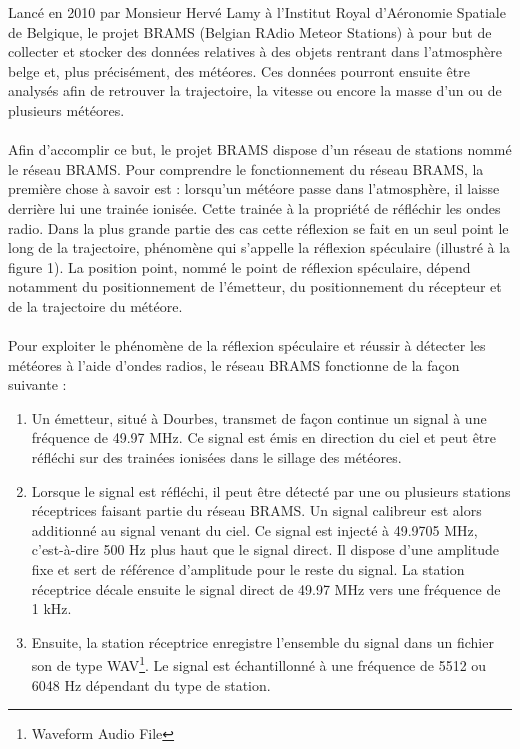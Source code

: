 \documentclass[11pt]{article}
\begin{document}
Lancé en 2010 par Monsieur Hervé Lamy à l'Institut Royal d'Aéronomie Spatiale de Belgique, le projet BRAMS (Belgian RAdio Meteor Stations) à pour but de collecter et stocker des données relatives à des objets rentrant dans l'atmosphère belge et, plus précisément, des météores.
Ces données pourront ensuite être analysés afin de retrouver la trajectoire, la vitesse ou encore la masse d'un ou de plusieurs météores.\\
\\
Afin d'accomplir ce but, le projet BRAMS dispose d'un réseau de stations nommé le réseau BRAMS.
Pour comprendre le fonctionnement du réseau BRAMS, la première chose à savoir est : lorsqu'un météore passe dans l'atmosphère, il laisse derrière lui une trainée ionisée.
Cette trainée à la propriété de réfléchir les ondes radio.
Dans la plus grande partie des cas cette réflexion se fait en un seul point le long de la trajectoire, phénomène qui s'appelle la réflexion spéculaire (illustré à la figure 1).
La position point, nommé le point de réflexion spéculaire, dépend notamment du positionnement de l'émetteur, du positionnement du récepteur et de la trajectoire du météore.\\
\\
Pour exploiter le phénomène de la réflexion spéculaire et réussir à détecter les météores à l'aide d'ondes radios, le réseau BRAMS fonctionne de la façon suivante :
\begin{enumerate}
    \item Un émetteur, situé à Dourbes, transmet de façon continue un signal à une fréquence de 49.97 MHz.
          Ce signal est émis en direction du ciel et peut être réfléchi sur des trainées ionisées dans le sillage des météores.
    \item Lorsque le signal est réfléchi, il peut être détecté par une ou plusieurs stations réceptrices faisant partie du réseau BRAMS.
          Un signal calibreur est alors additionné au signal venant du ciel.
          Ce signal est injecté à 49.9705 MHz, c'est-à-dire 500 Hz plus haut que le signal direct.
          Il dispose d'une amplitude fixe et sert de référence d'amplitude pour le reste du signal.
          La station réceptrice décale ensuite le signal direct de 49.97 MHz vers une fréquence de 1 kHz.
    \item Ensuite, la station réceptrice enregistre l'ensemble du signal dans un fichier son de type WAV\footnote{Waveform Audio File}.
          Le signal est échantillonné à une fréquence de 5512 ou 6048 Hz dépendant du type de station.
\end{enumerate}
\end{document}
